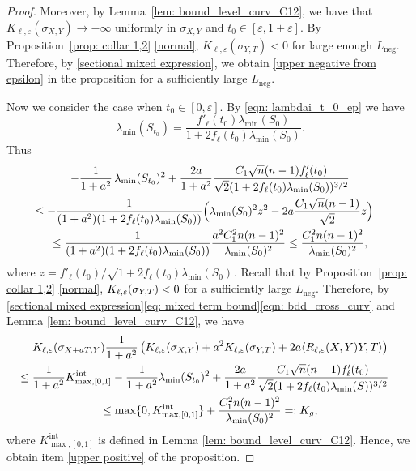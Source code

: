 \documentclass[10pt]{amsart}
\newcommand{\Int}{\mathrm{int}}
\newcommand{\Neg}{\mathrm{neg}}
\theoremstyle{definition}
\let\eps\varepsilon
\renewcommand{\>}{{\rangle}}
\newcommand{\<}{{\langle}}
\begin{document}
\begin{proof}
Moreover, by Lemma~\ref{lem: bound_level_curv_C12}, we have that $K_{\ell,\eps}(\sigma_{X,Y})\to -\infty$ uniformly in $\sigma_{X,Y}$ and $t_0\in[\eps,1+\eps]$. By Proposition~\ref{prop: collar 1,2} \eqref{normal}, $K_{\ell,\eps}(\sigma_{Y,T})<0$ for large enough $L_{\Neg}$. Therefore, by \eqref{sectional mixed expression}, we obtain \ref{upper negative from epsilon} in the proposition for a sufficiently large $L_{\Neg}$.

Now we consider the case when $t_0\in[0,\eps]$. By \eqref{eqn: lambdai_t_0_ep} we have
\[
\lambda_{\min}(S_{t_0})= \frac{f'_\ell(t_0)\lambda_{\min}(S_0)}{1+2f_\ell(t_0)\lambda_{\min}(S_0)}.
\]
Thus
\begin{multline}\label{eqn: bdd_cross_curv}
-\frac{1}{1+a^2}\,\lambda_{\min}(S_{t_0})^2+\frac{2a}{1+a^2}\frac{C_1\sqrt{n}(n-1)f'_\ell(t_0)}{\sqrt{2}(1+2f_\ell(t_0)\lambda_{\min}(S_0))^{3/2}}\\
\shoveright{\leq  -\frac{1}{(1+a^2)(1+2f_\ell(t_0)\lambda_{\min}(S_0))}\Bigl(\lambda_{\min}(S_0)^2z^2-2a\frac{C_1\sqrt{n}(n-1)}{\sqrt{2}}z \Bigr)}\\
\leq \frac{1}{(1+a^2)(1+2f_\ell(t_0)\lambda_{\min}(S_0))}\frac{a^2C_1^2n(n-1)^2}{\lambda_{\min}(S_0)^2}\leq \frac{C_1^2n(n-1)^2}{\lambda_{\min}(S_0)^2},
\end{multline}
where $z={f'_\ell(t_0)}/{\sqrt{1+2f_\ell(t_0)\lambda_{\min}(S_0)}}$. Recall that by Proposition~\ref{prop: collar 1,2} \eqref{normal}, $K_{\ell,\eps}(\sigma_{Y,T})\\< 0$ for a sufficiently large $L_{\Neg}$. Therefore, by \eqref{sectional mixed expression}\eqref{eq: mixed term bound}\eqref{eqn: bdd_cross_curv} and Lemma \ref{lem: bound_level_curv_C12}, we have
\begin{multline*}
K_{\ell,\eps}(\sigma_{X+aT,Y})\frac{1}{1+a^2}\left(K_{\ell,\eps}(\sigma_{X,Y})+a^2K_{\ell,\eps}(\sigma_{Y,T})+2a\langle R_{\ell,\eps}(X,Y)Y,T\rangle\right)\\
\shoveright{\leq  \frac{1}{1+a^2} K^{\Int}_{\max,[0,1]}-\frac{1}{1+a^2}\lambda_{\min}(S_{t_0})^2+\frac{2a}{1+a^2}\frac{C_1\sqrt{n}(n-1)f'_\ell(t_0)}{\sqrt{2}(1+2f_\ell(t_0)\lambda_{\min}(S))^{3/2}}}\\
\leq \max\{0,K^{\Int}_{\max,[0,1]}\}+\frac{C_1^2n(n-1)^2}{\lambda_{\min}(S_0)^2}=:K_g,
\end{multline*}
where $K^{\Int}_{\max,[0,1]}$ is defined in Lemma \ref{lem: bound_level_curv_C12}.
Hence, we obtain item \ref{upper positive} of the proposition.
\end{proof}
\end{document}
